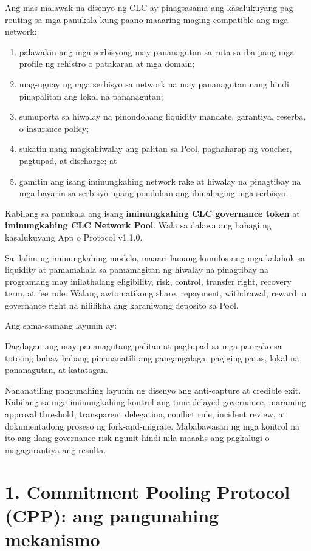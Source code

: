 \documentclass[11pt]{article}
\begin{document}
Ang mas malawak na disenyo ng CLC ay pinagsasama ang kasalukuyang pag-routing sa mga panukala kung paano maaaring maging compatible ang mga network:

\begin{enumerate}[leftmargin=*]
\item palawakin ang mga serbisyong may pananagutan sa ruta sa iba pang mga profile ng rehistro o patakaran at mga domain;
\item mag-ugnay ng mga serbisyo sa network na may pananagutan nang hindi pinapalitan ang lokal na pananagutan;
\item sumuporta sa hiwalay na pinondohang liquidity mandate, garantiya, reserba, o insurance policy;
\item sukatin nang magkahiwalay ang palitan sa Pool, paghaharap ng voucher, pagtupad, at discharge; at
\item gamitin ang isang iminungkahing network rake at hiwalay na pinagtibay na mga bayarin sa serbisyo upang pondohan ang ibinahaging mga serbisyo.
\end{enumerate}
Kabilang sa panukala ang isang \textbf{iminungkahing CLC governance token} at \textbf{iminungkahing CLC Network Pool}. Wala sa dalawa ang bahagi ng kasalukuyang App o Protocol v1.1.0.

Sa ilalim ng iminungkahing modelo, maaari lamang kumilos ang mga kalahok sa liquidity at pamamahala sa pamamagitan ng hiwalay na pinagtibay na programang may inilathalang eligibility, risk, control, transfer right, recovery term, at fee rule. Walang awtomatikong share, repayment, withdrawal, reward, o governance right na nililikha ang karaniwang deposito sa Pool.

Ang sama-samang layunin ay:

Dagdagan ang may-pananagutang palitan at pagtupad sa mga pangako sa totoong buhay habang pinananatili ang pangangalaga, pagiging patas, lokal na pananagutan, at katatagan.

Nananatiling pangunahing layunin ng disenyo ang anti-capture at credible exit. Kabilang sa mga iminungkahing kontrol ang time-delayed governance, maraming approval threshold, transparent delegation, conflict rule, incident review, at dokumentadong proseso ng fork-and-migrate. Mababawasan ng mga kontrol na ito ang ilang governance risk ngunit hindi nila maaalis ang pagkalugi o magagarantiya ang resulta.


\section*{1. Commitment Pooling Protocol (CPP): ang pangunahing mekanismo}
\end{document}
